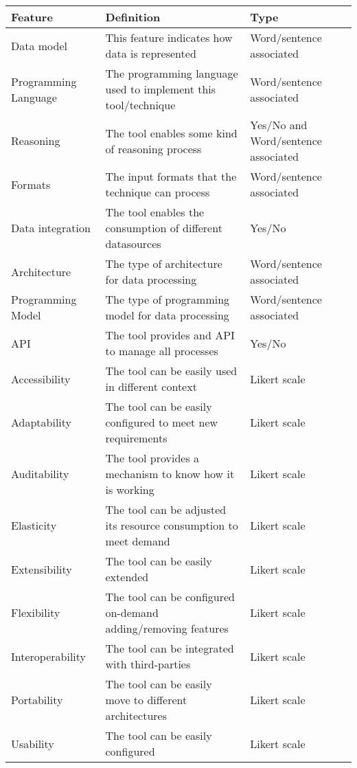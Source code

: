 \begin{table}[!ht]
\renewcommand{\arraystretch}{1.3}
\tiny
\begin{center}
\begin{tabular}[c]{|p{2.5cm}|p{5cm}|p{3cm}|} 
\hline
  \textbf{Feature} &  \textbf{Definition}  &  \textbf{Type} \\\hline
  Data model & This feature indicates how data is represented & Word/sentence associated \\ \hline
  Programming Language & The programming language used to implement this tool/technique & Word/sentence associated \\ \hline
  Reasoning & The tool enables some kind of reasoning process & Yes/No and Word/sentence associated  \\ \hline
  Formats & The input formats that the technique can process & Word/sentence associated  \\ \hline
  Data integration & The tool enables the consumption of different datasources &  Yes/No \\ \hline
  Architecture & The type of architecture for data processing & Word/sentence associated\\ \hline
  Programming Model & The type of programming model for data processing  & Word/sentence associated\\ \hline
  API & The tool provides and API to manage all processes & Yes/No  \\ \hline
  Accessibility & The tool can be easily used in different context & Likert scale  \\ \hline
  Adaptability & The tool can be easily configured to meet new requirements & Likert scale  \\ \hline
  Auditability & The tool provides a mechanism to know how it is working & Likert scale  \\ \hline
  Elasticity & The tool can be adjusted its resource consumption to meet demand & Likert scale  \\ \hline
  Extensibility & The tool can be easily extended & Likert scale  \\ \hline
  Flexibility & The tool can be configured on-demand adding/removing features & Likert scale  \\ \hline  
  Interoperability & The tool can be integrated with third-parties  & Likert scale  \\ \hline
  Portability & The tool can be easily move to different architectures & Likert scale  \\ \hline
  Usability & The tool can be easily configured  & Likert scale  \\ \hline

\end{tabular}
\end{center}
\end{table}
